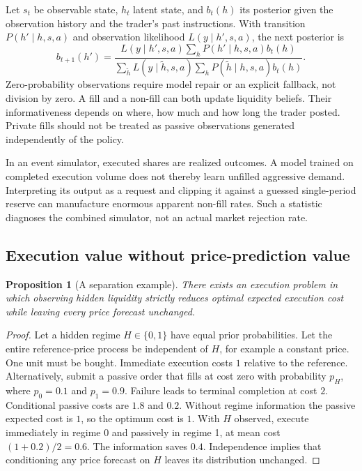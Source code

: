 \documentclass[11pt]{article}
\numberwithin{equation}{section}
\newtheorem{proposition}[theorem]{Proposition}
\theoremstyle{definition}
\theoremstyle{remark}
\theoremstyle{definition}
\begin{document}
Let $s_t$ be observable state, $h_t$ latent state, and $b_t(h)$ its posterior
given the observation history and the trader's past instructions. With
transition $P(h'\mid h,s,a)$ and observation likelihood
$L(y\mid h',s,a)$, the next posterior is
\begin{equation}\label{eq:bayes}
 b_{t+1}(h')=
 \frac{L(y\mid h',s,a)\sum_hP(h'\mid h,s,a)b_t(h)}
 {\sum_{\tilde h}L(y\mid\tilde h,s,a)
              \sum_hP(\tilde h\mid h,s,a)b_t(h)}.
\end{equation}
Zero-probability observations require model repair or an explicit fallback,
not division by zero. A fill and a non-fill can both update liquidity beliefs.
Their informativeness depends on where, how much and how long the trader
posted. Private fills should not be treated as passive observations generated
independently of the policy.

In an event simulator, executed shares are realized outcomes. A model trained
on completed execution volume does not thereby learn unfilled aggressive
demand. Interpreting its output as a request and clipping it against a guessed
single-period reserve can manufacture enormous apparent non-fill rates.
Such a statistic diagnoses the combined simulator, not an actual market
rejection rate.

\subsection{Execution value without price-prediction value}

\begin{proposition}[A separation example]\label{prop:separation}
There exists an execution problem in which observing hidden liquidity strictly
reduces optimal expected execution cost while leaving every price forecast
unchanged.
\end{proposition}
\begin{proof}
Let a hidden regime $H\in\{0,1\}$ have equal prior probabilities. Let the
entire reference-price process be independent of $H$, for example a constant
price. One unit must be bought. Immediate execution costs $1$ relative to
the reference. Alternatively, submit a passive order that fills at cost zero
with probability $p_H$, where $p_0=0.1$ and $p_1=0.9$. Failure leads to
terminal completion at cost $2$. Conditional passive costs are $1.8$ and $0.2$.
Without regime information the passive expected cost is $1$, so the optimum
cost is $1$. With $H$ observed, execute immediately in regime 0 and passively
in regime 1, at mean cost $(1+0.2)/2=0.6$. The information saves $0.4$.
Independence implies that conditioning any price forecast on $H$ leaves its
distribution unchanged.
\end{proof}
\end{document}
